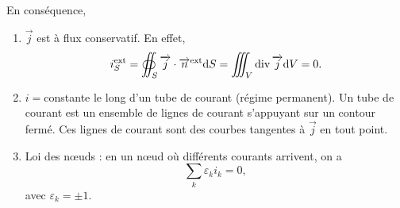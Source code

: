         En conséquence, 
        \begin{enumerate}[label=(\roman*)]
            \item $\vec{j}$ est à flux conservatif. En effet,
            \begin{equation}
                i_S^{\text{ext}}=\oiint_{S}\protect\overrightarrow{{j}}\cdot\protect\overrightarrow{{n}}^{\text{ext}}\mathrm{d} S=\iiint_{V}\operatorname{div}\protect\overrightarrow{{j}}\mathrm{d} V=0.
            \end{equation}
            \item $i=$constante le long d'un tube de courant (régime permanent). Un tube de courant est un ensemble de lignes de courant s'appuyant sur un contour fermé. Ces lignes de courant sont des courbes tangentes à $\vec{j}$ en tout point.
            \item Loi des n\oe uds : en un n\oe ud où différents courants arrivent, on a 
            \begin{equation}
                \boxed{
                    \sum_{k}\varepsilon_{k}i_k=0,
                }
            \end{equation}
            avec $\varepsilon_{k}=\pm1$.
        \end{enumerate}
